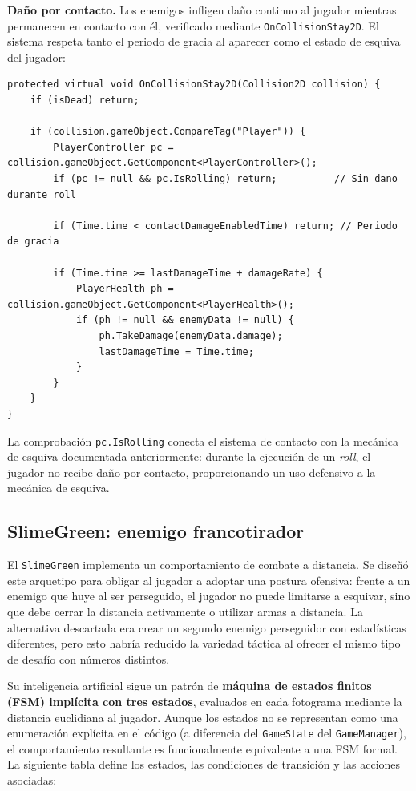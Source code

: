 \textbf{Daño por contacto.} Los enemigos infligen daño continuo al jugador mientras permanecen en contacto con él, verificado mediante \texttt{OnCollisionStay2D}. El sistema respeta tanto el periodo de gracia al aparecer como el estado de esquiva del jugador:

\begin{lstlisting}
protected virtual void OnCollisionStay2D(Collision2D collision) {
    if (isDead) return;
    
    if (collision.gameObject.CompareTag("Player")) {
        PlayerController pc = collision.gameObject.GetComponent<PlayerController>();
        if (pc != null && pc.IsRolling) return;          // Sin dano durante roll
        
        if (Time.time < contactDamageEnabledTime) return; // Periodo de gracia
        
        if (Time.time >= lastDamageTime + damageRate) {
            PlayerHealth ph = collision.gameObject.GetComponent<PlayerHealth>();
            if (ph != null && enemyData != null) {
                ph.TakeDamage(enemyData.damage);
                lastDamageTime = Time.time;
            }
        }
    }
}
\end{lstlisting}


La comprobación \texttt{pc.IsRolling} conecta el sistema de contacto con la mecánica de esquiva documentada anteriormente: durante la ejecución de un \textit{roll}, el jugador no recibe daño por contacto, proporcionando un uso defensivo a la mecánica de esquiva.

\subsection{SlimeGreen: enemigo francotirador}


El \texttt{SlimeGreen} implementa un comportamiento de combate a distancia. Se diseñó este arquetipo para obligar al jugador a adoptar una postura ofensiva: frente a un enemigo que huye al ser perseguido, el jugador no puede limitarse a esquivar, sino que debe cerrar la distancia activamente o utilizar armas a distancia. La alternativa descartada era crear un segundo enemigo perseguidor con estadísticas diferentes, pero esto habría reducido la variedad táctica al ofrecer el mismo tipo de desafío con números distintos.

Su inteligencia artificial sigue un patrón de \textbf{máquina de estados finitos (FSM) implícita con tres estados}, evaluados en cada fotograma mediante la distancia euclidiana al jugador. Aunque los estados no se representan como una enumeración explícita en el código (a diferencia del \texttt{GameState} del \texttt{GameManager}), el comportamiento resultante es funcionalmente equivalente a una FSM formal. La siguiente tabla define los estados, las condiciones de transición y las acciones asociadas:

